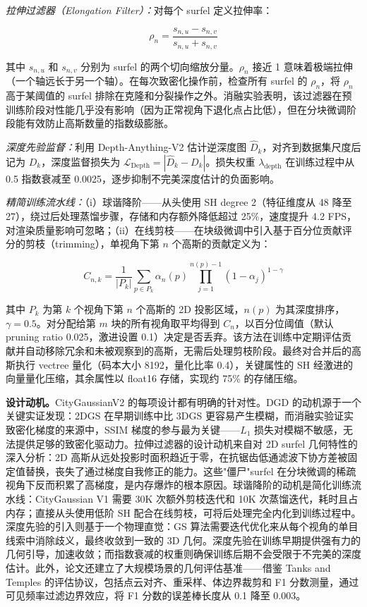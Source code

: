 \emph{拉伸过滤器（Elongation Filter）：}对每个 surfel 定义拉伸率：

\begin{equation}
\rho_n = \frac{s_{n,u} - s_{n,v}}{s_{n,u} + s_{n,v}}
\end{equation}

其中 $s_{n,u}$ 和 $s_{n,v}$ 分别为 surfel 的两个切向缩放分量。$\rho_n$ 接近 1 意味着极端拉伸（一个轴远长于另一个轴）。在每次致密化操作前，检查所有 surfel 的 $\rho_n$，将 $\rho_n$ 高于某阈值的 surfel 排除在克隆和分裂操作之外。消融实验表明，该过滤器在预训练阶段对性能几乎没有影响（因为正常视角下退化点占比低），但在分块微调阶段能有效防止高斯数量的指数级膨胀。

\emph{深度先验监督：}利用 Depth-Anything-V2 估计逆深度图 $\hat{D}_k$，对齐到数据集尺度后记为 $D_k$，深度监督损失为 $\mathcal{L}_{\text{Depth}} = |\hat{D}_k - D_k|$。损失权重 $\lambda_{\text{depth}}$ 在训练过程中从 0.5 指数衰减至 0.0025，逐步抑制不完美深度估计的负面影响。

\emph{精简训练流水线：}（i）球谐降阶——从头使用 SH degree 2（特征维度从 48 降至 27），绕过后处理蒸馏步骤，存储和内存额外降低超过 25\%，速度提升 4.2 FPS，对渲染质量影响可忽略；（ii）在线剪枝——在块级微调中引入基于百分位贡献评分的剪枝（trimming），单视角下第 $n$ 个高斯的贡献定义为：

\begin{equation}
C_{n,k} = \frac{1}{|P_k|}\sum_{p \in P_k} \alpha_n(p) \prod_{j=1}^{n(p)-1}(1-\alpha_j)^{1-\gamma}
\end{equation}

其中 $P_k$ 为第 $k$ 个视角下第 $n$ 个高斯的 2D 投影区域，$n(p)$ 为其深度排序，$\gamma=0.5$。对分配给第 $m$ 块的所有视角取平均得到 $C_n$，以百分位阈值（默认 pruning ratio 0.025，激进设置 0.1）决定是否丢弃。该方法在训练中定期评估贡献并自动移除冗余和未被观察到的高斯，无需后处理剪枝阶段。最终对合并后的高斯执行 vectree 量化（码本大小 8192，量化比率 0.4），关键属性的 SH 经激进的向量量化压缩，其余属性以 float16 存储，实现约 75\% 的存储压缩。

\textbf{设计动机。}CityGaussianV2 的每项设计都有明确的针对性。DGD 的动机源于一个关键实证发现：2DGS 在早期训练中比 3DGS 更容易产生模糊，而消融实验证实致密化梯度的来源中，SSIM 梯度的参与最为关键——$L_1$ 损失对模糊不敏感，无法提供足够的致密化驱动力。拉伸过滤器的设计动机来自对 2D surfel 几何特性的深入分析：2D 高斯从远处投影时面积趋近于零，在抗锯齿低通滤波下协方差被固定值替换，丧失了通过梯度自我修正的能力。这些"僵尸"surfel 在分块微调的稀疏视角下反而积累了高梯度，是内存爆炸的根本原因。球谐降阶的动机是简化训练流水线：CityGaussian V1 需要 30K 次额外剪枝迭代和 10K 次蒸馏迭代，耗时且占内存；直接从头使用低阶 SH 配合在线剪枝，可将后处理完全内化到训练过程中。深度先验的引入则基于一个物理直觉：GS 算法需要迭代优化来从每个视角的单目线索中消除歧义，最终收敛到一致的 3D 几何。深度先验在训练早期提供强有力的几何引导，加速收敛；而指数衰减的权重则确保训练后期不会受限于不完美的深度估计。此外，论文还建立了大规模场景的几何评估基准——借鉴 Tanks and Temples 的评估协议，包括点云对齐、重采样、体边界裁剪和 F1 分数测量，通过可见频率过滤边界效应，将 F1 分数的误差棒长度从 0.1 降至 0.003。

